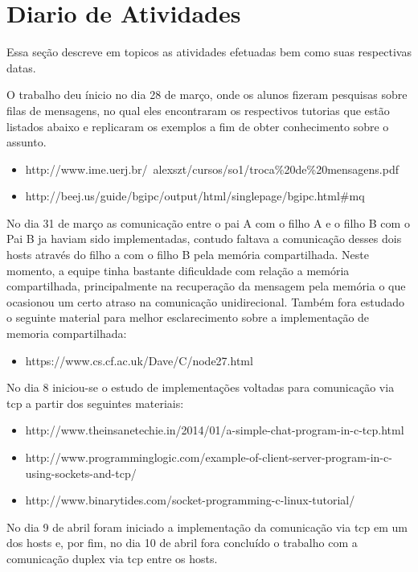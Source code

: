 \chapter{Diario de Atividades}
Essa seção descreve em topicos as atividades efetuadas bem como suas respectivas datas.

O trabalho deu ínicio no dia 28 de março, onde os alunos fizeram pesquisas sobre filas de mensagens, no qual eles encontraram os respectivos tutorias que estão listados abaixo e replicaram os exemplos a fim de obter conhecimento sobre o assunto.

\begin{itemize}
	\item http://www.ime.uerj.br/~alexszt/cursos/so1/troca\%20de\%20mensagens.pdf
	\item http://beej.us/guide/bgipc/output/html/singlepage/bgipc.html\#mq
\end{itemize}

No dia 31 de março as comunicação entre o pai A com o filho A e o filho B com o Pai B ja haviam sido implementadas, contudo faltava a comunicação desses dois hosts através do filho a com o filho B pela memória compartilhada. Neste momento, a equipe tinha bastante dificuldade com relação a memória compartilhada, principalmente na recuperação  da mensagem pela memória o que ocasionou um certo atraso na comunicação unidirecional. Também fora estudado o seguinte material para melhor esclarecimento sobre a implementação  de memoria compartilhada:

\begin{itemize}
	\item https://www.cs.cf.ac.uk/Dave/C/node27.html

\end{itemize}
	
No dia 8 iniciou-se o estudo de implementações voltadas para comunicação via tcp a partir dos seguintes materiais:

\begin{itemize}
	\item http://www.theinsanetechie.in/2014/01/a-simple-chat-program-in-c-tcp.html
	\item http://www.programminglogic.com/example-of-client-server-program-in-c-using-sockets-and-tcp/
	\item http://www.binarytides.com/socket-programming-c-linux-tutorial/	
\end{itemize}

No dia 9 de abril foram iniciado a implementação da comunicação via tcp em um dos hosts e, por fim, no dia 10 de abril fora concluído o trabalho com a comunicação duplex via tcp entre os hosts. 

